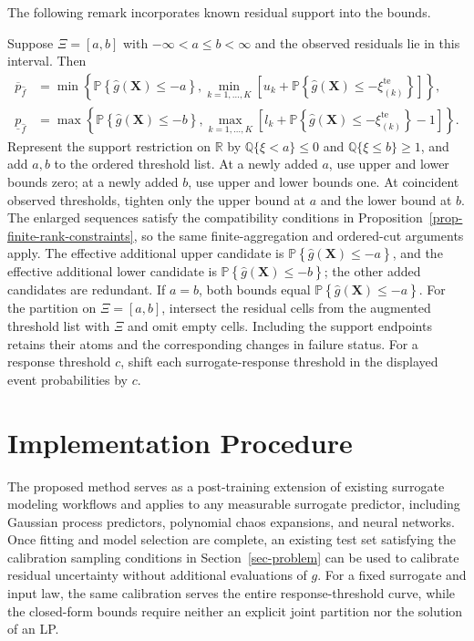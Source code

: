 \documentclass[review,11pt,3p,authoryear,nopreprintline]{elsarticle}
\begin{document}
The following remark incorporates known residual support into the bounds.

\begin{remark}
  \label{rem-interval-support}
  Suppose $\Xi=[a,b]$ with $-\infty<a\le b<\infty$ and the observed residuals lie in this interval. Then
  \begin{align*}
    \overline p_{\hat f}
      &=\min\left\{\mathbb P\left\{\hat g(\bm X)\le-a\right\},
        \min_{k=1,\ldots,K}\left[u_k+\mathbb P\left\{\hat g(\bm X)\le-\xi_{(k)}^{\mathrm{te}}\right\}\right]\right\},\\
    \underline p_{\hat f}
      &=\max\left\{\mathbb P\left\{\hat g(\bm X)\le-b\right\},
        \max_{k=1,\ldots,K}\left[l_k+\mathbb P\left\{\hat g(\bm X)\le-\xi_{(k)}^{\mathrm{te}}\right\}-1\right]\right\}.
  \end{align*}
  Represent the support restriction on $\mathbb R$ by $\mathbb Q\{\xi<a\}\le0$ and $\mathbb Q\{\xi\le b\}\ge1$, and add $a,b$ to the ordered threshold list. At a newly added $a$, use upper and lower bounds zero; at a newly added $b$, use upper and lower bounds one. At coincident observed thresholds, tighten only the upper bound at $a$ and the lower bound at $b$. The enlarged sequences satisfy the compatibility conditions in Proposition~\ref{prop-finite-rank-constraints}, so the same finite-aggregation and ordered-cut arguments apply. The effective additional upper candidate is $\mathbb P\left\{\hat g(\bm X)\le-a\right\}$, and the effective additional lower candidate is $\mathbb P\left\{\hat g(\bm X)\le-b\right\}$; the other added candidates are redundant. If $a=b$, both bounds equal $\mathbb P\left\{\hat g(\bm X)\le-a\right\}$. For the partition on $\Xi=[a,b]$, intersect the residual cells from the augmented threshold list with $\Xi$ and omit empty cells. Including the support endpoints retains their atoms and the corresponding changes in failure status. For a response threshold $c$, shift each surrogate-response threshold in the displayed event probabilities by $c$.
\end{remark}

\section{Implementation Procedure}
\label{sec-implementation}

The proposed method serves as a post-training extension of existing surrogate modeling workflows and applies to any measurable surrogate predictor, including Gaussian process predictors, polynomial chaos expansions, and neural networks. Once fitting and model selection are complete, an existing test set satisfying the calibration sampling conditions in Section~\ref{sec-problem} can be used to calibrate residual uncertainty without additional evaluations of $g$. For a fixed surrogate and input law, the same calibration serves the entire response-threshold curve, while the closed-form bounds require neither an explicit joint partition nor the solution of an LP.
\end{document}
